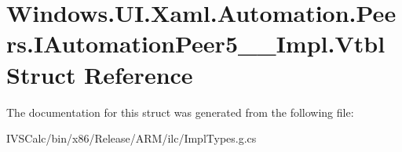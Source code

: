 \hypertarget{struct_windows_1_1_u_i_1_1_xaml_1_1_automation_1_1_peers_1_1_i_automation_peer5_____impl_1_1_vtbl}{}\section{Windows.\+U\+I.\+Xaml.\+Automation.\+Peers.\+I\+Automation\+Peer5\+\_\+\+\_\+\+Impl.\+Vtbl Struct Reference}
\label{struct_windows_1_1_u_i_1_1_xaml_1_1_automation_1_1_peers_1_1_i_automation_peer5_____impl_1_1_vtbl}


The documentation for this struct was generated from the following file\+:\begin{DoxyCompactItemize}
\item 
I\+V\+S\+Calc/bin/x86/\+Release/\+A\+R\+M/ilc/Impl\+Types.\+g.\+cs\end{DoxyCompactItemize}
